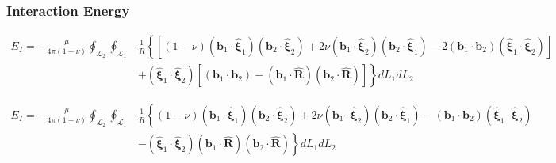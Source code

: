 \documentclass[10pt]{report}
\begin{document}
{\subsubsection{Interaction Energy}

\begin{align}
E_I=-\frac{\mu}{4\pi(1-\nu)}\oint_{\mathcal{L}_{2}}\oint_{\mathcal{L}_{1}}&\frac{1}{R}\left\{\left[(1-\nu)\left(\bm b_{1}\cdot\hat{\bm \xi}_1\right)\left(\bm b_{2}\cdot\hat{\bm \xi}_{2}\right)
+2\nu\left( \bm b_1\cdot\hat{\bm \xi}_2\right)\left(\bm b_2\cdot\hat{\bm \xi}_1\right)
-2\left(\bm b_1\cdot{\bm b}_2\right)\left( \hat{\bm\xi}_1\cdot\hat{\bm \xi}_2\right)
\right]\right.\nonumber\\
&\left.+\left( \hat{\bm\xi}_1\cdot\hat{\bm \xi}_2\right) \left[\left(\bm b_1\cdot\bm b_2\right)-\left(\bm b_1\cdot\hat{\bm R}\right)\left(\bm b_2\cdot\hat{\bm R}\right)\right]\right\} dL_{1} dL_{2}
\label{interaction_energy_loop_vector}
\end{align}

\begin{align}
E_I=-\frac{\mu}{4\pi(1-\nu)}\oint_{\mathcal{L}_{2}}\oint_{\mathcal{L}_{1}}&\frac{1}{R}\left\{(1-\nu)\left(\bm b_{1}\cdot\hat{\bm \xi}_1\right)\left(\bm b_{2}\cdot\hat{\bm \xi}_{2}\right)
+2\nu\left( \bm b_1\cdot\hat{\bm \xi}_2\right)\left(\bm b_2\cdot\hat{\bm \xi}_1\right)
-\left(\bm b_1\cdot{\bm b}_2\right)\left( \hat{\bm\xi}_1\cdot\hat{\bm \xi}_2\right)
\right.\nonumber\\
&\left. -\left( \hat{\bm\xi}_1\cdot\hat{\bm \xi}_2\right)\left(\bm b_1\cdot\hat{\bm R}\right)\left(\bm b_2\cdot\hat{\bm R}\right)\right\} dL_{1} dL_{2}
\label{interaction_energy_loop_vector}
\end{align}


}
\end{document}
